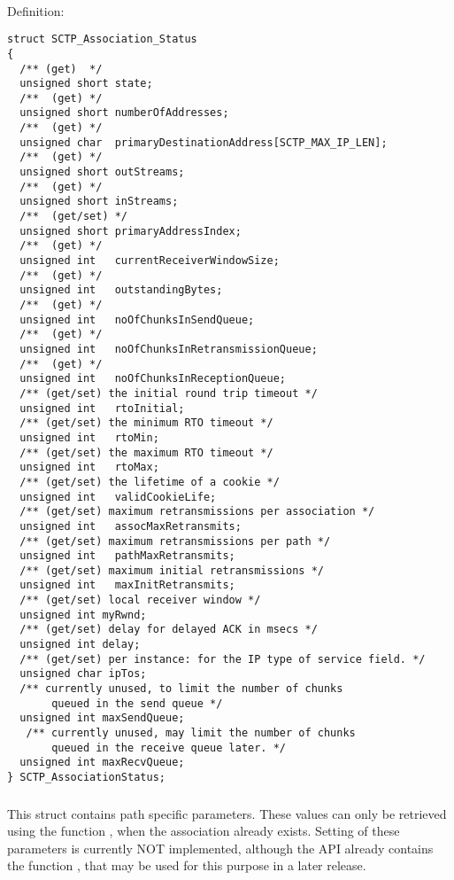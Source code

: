 \documentclass[10pt]{article}
\newcommand{\bv}{\vspace{0,1cm}\noindent \\ Definition:\footnotesize\begin{verbatim}}
\newcommand{\n}{\normalsize}
\begin{document}
\bv
struct SCTP_Association_Status
{
  /** (get)  */
  unsigned short state;
  /**  (get) */
  unsigned short numberOfAddresses;
  /**  (get) */
  unsigned char  primaryDestinationAddress[SCTP_MAX_IP_LEN];
  /**  (get) */
  unsigned short outStreams;
  /**  (get) */
  unsigned short inStreams;
  /**  (get/set) */
  unsigned short primaryAddressIndex;
  /**  (get) */
  unsigned int   currentReceiverWindowSize;
  /**  (get) */
  unsigned int   outstandingBytes;
  /**  (get) */
  unsigned int   noOfChunksInSendQueue;
  /**  (get) */
  unsigned int   noOfChunksInRetransmissionQueue;
  /**  (get) */
  unsigned int   noOfChunksInReceptionQueue;
  /** (get/set) the initial round trip timeout */
  unsigned int   rtoInitial;
  /** (get/set) the minimum RTO timeout */
  unsigned int   rtoMin;
  /** (get/set) the maximum RTO timeout */
  unsigned int   rtoMax;
  /** (get/set) the lifetime of a cookie */
  unsigned int   validCookieLife;
  /** (get/set) maximum retransmissions per association */
  unsigned int   assocMaxRetransmits;
  /** (get/set) maximum retransmissions per path */
  unsigned int   pathMaxRetransmits;
  /** (get/set) maximum initial retransmissions */
  unsigned int   maxInitRetransmits;
  /** (get/set) local receiver window */
  unsigned int myRwnd;
  /** (get/set) delay for delayed ACK in msecs */
  unsigned int delay;
  /** (get/set) per instance: for the IP type of service field. */
  unsigned char ipTos;
  /** currently unused, to limit the number of chunks
       queued in the send queue */
  unsigned int maxSendQueue;
   /** currently unused, may limit the number of chunks
       queued in the receive queue later. */
  unsigned int maxRecvQueue;
} SCTP_AssociationStatus;
\end{verbatim}
\n


\subsubsection{}
\label{pathstatus-struct}
This struct contains path specific parameters. These
values can only be retrieved using the function ,
 when the association already exists. Setting of these parameters is
currently NOT implemented, although the API already contains the
function  , that may be used for
this purpose in a later release.
\end{document}
